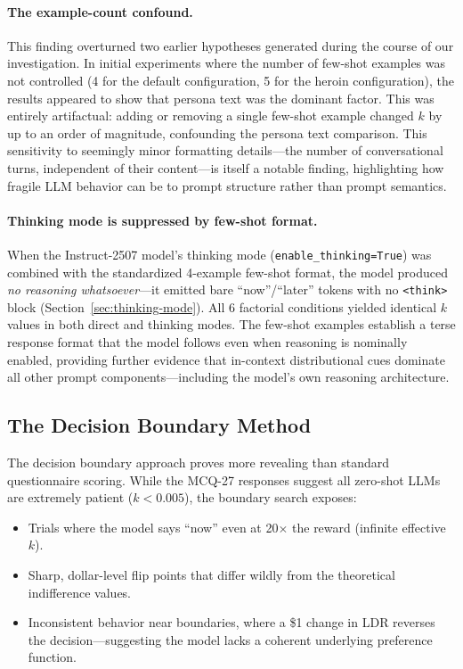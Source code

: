 \documentclass[11pt,a4paper]{article}
\begin{document}
\paragraph{The example-count confound.} This finding overturned two earlier hypotheses generated during the course of our investigation. In initial experiments where the number of few-shot examples was not controlled (4 for the default configuration, 5 for the heroin configuration), the results appeared to show that persona text was the dominant factor. This was entirely artifactual: adding or removing a single few-shot example changed $k$ by up to an order of magnitude, confounding the persona text comparison. This sensitivity to seemingly minor formatting details---the number of conversational turns, independent of their content---is itself a notable finding, highlighting how fragile LLM behavior can be to prompt structure rather than prompt semantics.

\paragraph{Thinking mode is suppressed by few-shot format.} When the Instruct-2507 model's thinking mode (\texttt{enable\_thinking=True}) was combined with the standardized 4-example few-shot format, the model produced \emph{no reasoning whatsoever}---it emitted bare ``now''/``later'' tokens with no \texttt{<think>} block (Section~\ref{sec:thinking-mode}). All 6 factorial conditions yielded identical $k$ values in both direct and thinking modes. The few-shot examples establish a terse response format that the model follows even when reasoning is nominally enabled, providing further evidence that in-context distributional cues dominate all other prompt components---including the model's own reasoning architecture.

\subsection{The Decision Boundary Method}

The decision boundary approach proves more revealing than standard questionnaire scoring. While the MCQ-27 responses suggest all zero-shot LLMs are extremely patient ($k < 0.005$), the boundary search exposes:

\begin{itemize}
    \item Trials where the model says ``now'' even at 20$\times$ the reward (infinite effective $k$).
    \item Sharp, dollar-level flip points that differ wildly from the theoretical indifference values.
    \item Inconsistent behavior near boundaries, where a \$1 change in LDR reverses the decision---suggesting the model lacks a coherent underlying preference function.
\end{itemize}
\end{document}
